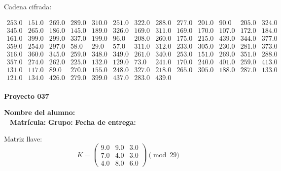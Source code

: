 \documentclass[12pt]{article}
\begin{document}
Cadena cifrada:
\begin{center}
$\begin{array}{lllllllllllll}
253.0 & 151.0 & 269.0 & 289.0 & 310.0 & 251.0 & 322.0 & 288.0 & 277.0 & 201.0 & 90.0 & 205.0 & 324.0\\
345.0 & 265.0 & 186.0 & 145.0 & 189.0 & 326.0 & 169.0 & 311.0 & 169.0 & 170.0 & 107.0 & 172.0 & 184.0\\
161.0 & 399.0 & 299.0 & 337.0 & 199.0 & 96.0 & 208.0 & 260.0 & 175.0 & 215.0 & 439.0 & 344.0 & 377.0\\
359.0 & 254.0 & 297.0 & 58.0 & 29.0 & 57.0 & 311.0 & 312.0 & 233.0 & 305.0 & 230.0 & 281.0 & 373.0\\
316.0 & 360.0 & 345.0 & 259.0 & 348.0 & 349.0 & 261.0 & 340.0 & 253.0 & 151.0 & 269.0 & 351.0 & 288.0\\
357.0 & 274.0 & 262.0 & 225.0 & 132.0 & 129.0 & 73.0 & 241.0 & 170.0 & 240.0 & 401.0 & 259.0 & 413.0\\
131.0 & 117.0 & 89.0 & 270.0 & 155.0 & 248.0 & 327.0 & 218.0 & 265.0 & 305.0 & 188.0 & 287.0 & 133.0\\
121.0 & 134.0 & 426.0 & 279.0 & 399.0 & 437.0 & 283.0 & 439.0\\
\end{array}$
\end{center}

\newpage


\textbf{Proyecto 037}

\textbf{Nombre del alumno:} \underline{\hspace{13cm}}\\\
\vspace{1cm}
\textbf{Matrícula:} \underline{\hspace{4cm}} \hspace{1cm}
\textbf{Grupo:} \underline{\hspace{2cm}}
\textbf{Fecha de entrega:} \underline{\hspace{2cm}}

\medskip

Matriz llave:
\[
K = \begin{pmatrix}
9.0 & 9.0 & 3.0\\
7.0 & 4.0 & 3.0\\
4.0 & 8.0 & 6.0
\end{pmatrix} \pmod{29}
\]
\end{document}
